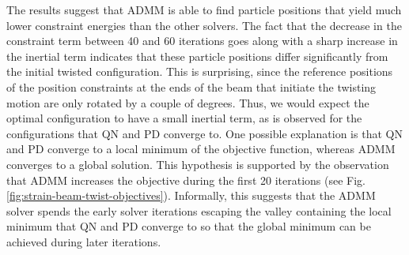 The results suggest that ADMM is able to find particle positions that yield much lower constraint energies than the other solvers. The fact that the decrease in the 
constraint term between 40 and 60 iterations goes along with a sharp increase in the inertial term indicates that these particle positions differ significantly from the 
initial twisted configuration. This is surprising, since the reference positions of the position constraints at the ends of the beam that initiate the twisting motion 
are only rotated by a couple of degrees. Thus, we would expect the optimal configuration to have a small inertial term, as is observed for the configurations that 
QN and PD converge to. One possible explanation is that QN and PD converge to a local minimum of the objective function, whereas ADMM converges to a global solution. This 
hypothesis is supported by the observation that ADMM increases the objective during the first 20 iterations (see Fig. \ref{fig:strain-beam-twist-objectives}). Informally, this 
suggests that the ADMM solver spends the early solver iterations escaping the valley containing the local minimum that QN and PD converge to so that the global minimum 
can be achieved during later iterations.

